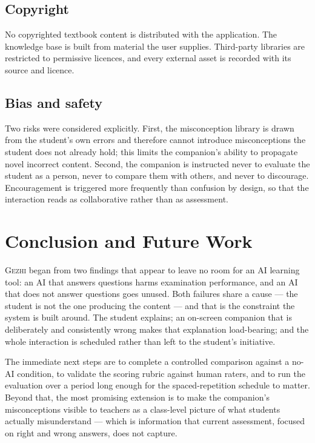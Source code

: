 \documentclass[11pt,a4paper]{article}
\newcommand{\gezhi}{\textsc{Gezhi}}
\begin{document}
\subsection{Copyright}

No copyrighted textbook content is distributed with the application. The knowledge base is
built from material the user supplies. Third-party libraries are restricted to permissive
licences, and every external asset is recorded with its source and licence.

\subsection{Bias and safety}

Two risks were considered explicitly. First, the misconception library is drawn from the
student's own errors and therefore cannot introduce misconceptions the student does not
already hold; this limits the companion's ability to propagate novel incorrect content.
Second, the companion is instructed never to evaluate the student as a person, never to
compare them with others, and never to discourage. Encouragement is triggered more
frequently than confusion by design, so that the interaction reads as collaborative rather
than as assessment.

\section{Conclusion and Future Work}

\gezhi{} began from two findings that appear to leave no room for an AI learning tool: an AI
that answers questions harms examination performance, and an AI that does not answer
questions goes unused. Both failures share a cause --- the student is not the one producing
the content --- and that is the constraint the system is built around. The student explains;
an on-screen companion that is deliberately and consistently wrong makes that explanation
load-bearing; and the whole interaction is scheduled rather than left to the student's
initiative.

The immediate next steps are to complete a controlled comparison against a no-AI condition,
to validate the scoring rubric against human raters, and to run the evaluation over a period
long enough for the spaced-repetition schedule to matter. Beyond that, the most promising
extension is to make the companion's misconceptions visible to teachers as a class-level
picture of what students actually misunderstand --- which is information that current
assessment, focused on right and wrong answers, does not capture.
\end{document}
